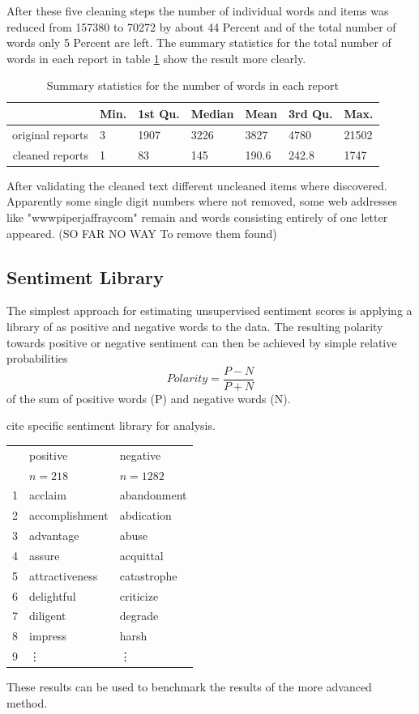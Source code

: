After these five cleaning steps the number of individual words and items was reduced from 157380 to 70272 by about 44 Percent and of the total number of words only 5 Percent are left. The summary statistics for the total number of words in each report in table \ref{tab:summaryCR} show the result more clearly. 
\begin{table}[ht]
\centering
\begin{tabular}{rllllll}
  \hline
  & Min. & 1st Qu. & Median  &  Mean & 3rd Qu. &   Max. \\
  \hline
  original reports & 3    &  1907 &  3226  &  3827 &  4780 &  21502  \\ 
  cleaned reports  & 1  &  83 &  145 & 190.6 & 242.8 & 1747  \\ 
   \hline
\end{tabular}\label{tab:summaryCR}
\caption{Summary statistics for the number of words in each report}
\end{table}

After validating the cleaned text different uncleaned items where discovered. Apparently some single digit numbers where not removed, some web addresses like "wwwpiperjaffraycom" remain and words consisting entirely of one letter appeared. (SO FAR NO WAY To remove them found)

\subsection{Sentiment Library}\label{BoW}
The simplest approach for estimating unsupervised sentiment scores is applying a library of as positive and negative words to the data. The resulting polarity towards positive or negative sentiment can then be achieved by simple relative probabilities
\begin{equation}
    Polarity = \frac{P - N}{P + N}
\end{equation}
of the sum of positive words (P) and negative words (N). 

cite specific sentiment library for analysis.
\begin{table}[ht]
\centering
\begin{tabular}{rll}
  \hline
 & positive & negative \\ 
 & $n = 218$ & $n = 1282$ \\ 
  \hline
  1 & acclaim & abandonment \\ 
  2 & accomplishment & abdication \\ 
  3 & advantage & abuse \\ 
  4 & assure & acquittal \\ 
  5 & attractiveness & catastrophe \\ 
  6 & delightful & criticize \\ 
  7 & diligent & degrade \\ 
  8 & impress & harsh \\ 
  9 & \vdots & \vdots \\ 
   \hline
\end{tabular}
\end{table}
These results can be used to benchmark the results of the more advanced method.



